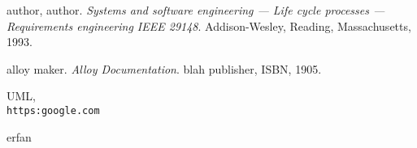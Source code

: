 




\begin{thebibliography}{9}
author, author. 
\textit{Systems and software engineering — Life cycle processes — Requirements engineering IEEE 29148}. 
Addison-Wesley, Reading, Massachusetts, 1993.
 
alloy maker. 
\textit{Alloy Documentation}. 
blah publisher, ISBN, 1905.
 
UML,
\\\texttt{https:google.com}
\end{thebibliography}

erfan \cite{alloy}
